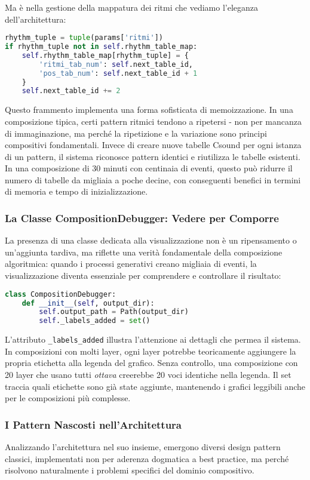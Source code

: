 Ma è nella gestione della mappatura dei ritmi che vediamo l'eleganza dell'architettura:

\begin{lstlisting}[language=Python]
rhythm_tuple = tuple(params['ritmi'])
if rhythm_tuple not in self.rhythm_table_map:
    self.rhythm_table_map[rhythm_tuple] = {
        'ritmi_tab_num': self.next_table_id,
        'pos_tab_num': self.next_table_id + 1
    }
    self.next_table_id += 2
\end{lstlisting}

Questo frammento implementa una forma sofisticata di memoizzazione. In una composizione tipica, certi pattern ritmici tendono a ripetersi - non per mancanza di immaginazione, ma perché la ripetizione e la variazione sono principi compositivi fondamentali. Invece di creare nuove tabelle Csound per ogni istanza di un pattern, il sistema riconosce pattern identici e riutilizza le tabelle esistenti. In una composizione di 30 minuti con centinaia di eventi, questo può ridurre il numero di tabelle da migliaia a poche decine, con conseguenti benefici in termini di memoria e tempo di inizializzazione.
\subsubsection{La Classe CompositionDebugger: Vedere per Comporre}
La presenza di una classe dedicata alla visualizzazione non è un ripensamento o un'aggiunta tardiva, ma riflette una verità fondamentale della composizione algoritmica: quando i processi generativi creano migliaia di eventi, la visualizzazione diventa essenziale per comprendere e controllare il risultato:

\begin{lstlisting}[language=Python]
class CompositionDebugger:
    def __init__(self, output_dir):
        self.output_path = Path(output_dir)
        self._labels_added = set()
\end{lstlisting}

L'attributo \texttt{\_labels\_added} illustra l'attenzione ai dettagli che permea il sistema. In composizioni con molti layer, ogni layer potrebbe teoricamente aggiungere la propria etichetta alla legenda del grafico. Senza controllo, una composizione con 20 layer che usano tutti \textit{ottava} creerebbe 20 voci identiche nella legenda. Il set traccia quali etichette sono già state aggiunte, mantenendo i grafici leggibili anche per le composizioni più complesse.
\subsubsection{I Pattern Nascosti nell'Architettura}
Analizzando l'architettura nel suo insieme, emergono diversi design pattern classici, implementati non per aderenza dogmatica a best practice, ma perché risolvono naturalmente i problemi specifici del dominio compositivo.

